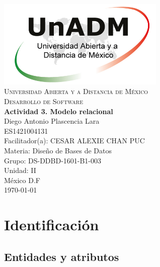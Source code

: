 \documentclass[spanish,12pt,letterpapper]{article}
\begin{document}
	\begin{titlepage}
		\begin{center}
			\includegraphics[width=0.6\textwidth]{../logoUnADM}~\\[1cm] 
			\textsc{Universidad Abierta y a Distancia de México}\\[0.8cm]
			\textsc{Desarrollo de Software}\\[1.8cm]
			
			\textbf{ \Large Actividad 3. Modelo relacional}\\[3cm]
			
			Diego Antonio Plascencia Lara\\ ES1421004131 \\[0.4cm]
			Facilitador(a): CESAR ALEXIE CHAN PUC  \\
			Materia: Diseño de Bases de Datos\\
			Grupo: DS-DDBD-1601-B1-003 \\
			Unidad: II \\
			
			\vfill México D.F\\{\today}
			
		\end{center}
	\end{titlepage}
	\section{Identificación}
	
	\subsection{Entidades y atributos}
	
\end{document}

